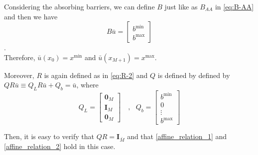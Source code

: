 \documentclass[11pt]{article}
\begin{document}
Considering the absorbing barriers, we can define $B$ just like as $B_{AA}$ in \eqref{eq:B-AA} and then we have
\begin{equation}
B\bar{u} = \begin{bmatrix}
b^{\min}\\
b^{\max}
\end{bmatrix}
\end{equation}.\\
Therefore, $\bar{u}(x_0) = x^{\min}$ and $\bar{u}(x_{M+1}) = x^{\max}$.

Moreover, $R$ is again defined as in \eqref{eq:R-2} and $Q$ is defined by defined by $Q R\bar{u}\equiv Q_L R\bar{u}+Q_b = \bar{u}$, where
\begin{equation}
Q_L = \begin{bmatrix}
\mathbf{0}_M \\
\mathbf{I}_M  \\
\mathbf{0}_M
\end{bmatrix}%
\quad, \text{ } Q_b = \begin{bmatrix}
b^{\min}\\
0\\
\vdots\\
b^{\max}
\end{bmatrix}%
\end{equation}

Then, it is easy to verify that $Q  R = \mathbf{I}_{\bar{M}}$ and that \eqref{affine_relation_1} and \eqref{affine_relation_2} hold in this case.
\end{document}
